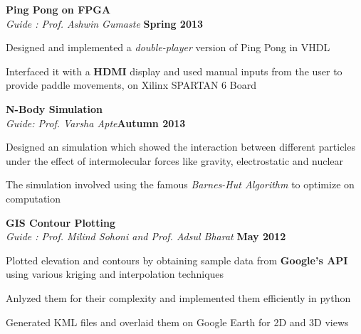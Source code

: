 \documentclass[margin,11pt]{resume}
\begin{document}
\begin{resume}
\textbf{Ping Pong on FPGA}\vspace{1mm} \hfill\\
    \textsl{Guide : Prof. Ashwin Gumaste} \hfill \textbf{Spring 2013} \vspace{-4mm}\\ 
		 \begin{list2}
             \item Designed and implemented a \emph{double-player} version of Ping Pong in VHDL 
             \item Interfaced it with a \textbf{HDMI} display and  used manual inputs from the user to provide paddle movements, on Xilinx SPARTAN 6 Board  
				\end{list2}
\vspace{-2.75mm} 
\textbf{N-Body Simulation}\vspace{1mm} \hfill\\ 
\textsl{Guide: Prof. Varsha Apte}\hfill \textbf{Autumn 2013}\vspace{-5mm}\\
				\begin{list2}	
                    \item Designed an simulation which showed the interaction between different particles under the effect of intermolecular forces like gravity, electrostatic and nuclear
                    \item The simulation involved using the famous \emph{Barnes-Hut Algorithm} to optimize on computation
				\end{list2}\vspace{-2.75mm} 

\textbf{GIS Contour Plotting}\vspace{1mm} \hfill\\ 
\textsl{Guide : Prof. Milind Sohoni and Prof. Adsul Bharat}	\hfill \textbf{May 2012}\vspace{-4mm}\\
				\begin{list2}
                    \item Plotted elevation and contours by obtaining sample data from \textbf{Google's API} using various kriging and interpolation techniques 
                    \item Anlyzed them for their complexity and implemented them efficiently in python 
                    \item Generated KML files and overlaid them on Google Earth for 2D and 3D views
				\end{list2}				\vspace{-2.75mm} 




\end{resume}
\end{document}
